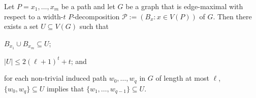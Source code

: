 \documentclass[kpfonts]{patmorin}
\theoremstyle{named}
\begin{document}
\begin{lem}\label{path-induced}
    Let $P=x_1,\ldots,x_m$ be a path and let $G$ be a graph that is edge-maximal with respect to a width-$t$ $P$-decomposition $\mathcal{P}:=(B_x:x\in V(P))$ of $G$.  Then there exists a set $U\subseteq V(G)$ such that
    \begin{compactenum}[(Z1)]
        \item $B_{x_1}\cup B_{x_m}\subseteq U$;\label{values-u}
        \item $|U|\le 2(\ell+1)^t + t$; and \label{size-u}
        \item for each non-trivial induced path $w_0,\ldots,w_q$ in $G$ of length at most $\ell$, $\{w_0,w_q\}\subseteq U$ implies that $\{w_1,\ldots,w_{q-1}\}\subseteq U$.\label{induced-u}
    \end{compactenum}
\end{lem}
\end{document}
